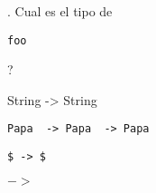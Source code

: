 \documentclass{gift}
\begin{document}
\begin{giftFragmento}
.
Cual es el tipo de\end  {giftFragmento}

\verb!foo!
\begin{giftFragmento}
?\end  {giftFragmento}


\begin{giftMO}
\item \begin{giftFragmento}
String  -> String\end  {giftFragmento}


\item \verb!Papa  -> Papa  -> Papa!
\begin{giftFragmento}
\end  {giftFragmento}


\item \verb!$ -> $!
\begin{giftFragmento}
\end  {giftFragmento}


\item $->$
\begin{giftFragmento}
\end  {giftFragmento}


\end  {giftMO}

\begin{giftFragmento}
\end  {giftFragmento}


\begin{giftComentario}

\end  {giftComentario}
\end{document}
